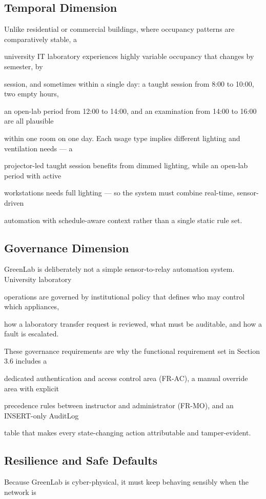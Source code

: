 \subsection{Temporal Dimension}
Unlike residential or commercial buildings, where occupancy patterns are comparatively stable, a

university IT laboratory experiences highly variable occupancy that changes by semester, by

session, and sometimes within a single day: a taught session from 8:00 to 10:00, two empty hours,

an open-lab period from 12:00 to 14:00, and an examination from 14:00 to 16:00 are all plausible

within one room on one day. Each usage type implies different lighting and ventilation needs --- a

projector-led taught session benefits from dimmed lighting, while an open-lab period with active

workstations needs full lighting --- so the system must combine real-time, sensor-driven

automation with schedule-aware context rather than a single static rule set.


\subsection{Governance Dimension}
GreenLab is deliberately not a simple sensor-to-relay automation system. University laboratory

operations are governed by institutional policy that defines who may control which appliances,

how a laboratory transfer request is reviewed, what must be auditable, and how a fault is escalated.

These governance requirements are why the functional requirement set in Section 3.6 includes a

dedicated authentication and access control area (FR-AC), a manual override area with explicit

precedence rules between instructor and administrator (FR-MO), and an INSERT-only AuditLog

table that makes every state-changing action attributable and tamper-evident.


\subsection{Resilience and Safe Defaults}
Because GreenLab is cyber-physical, it must keep behaving sensibly when the network is

